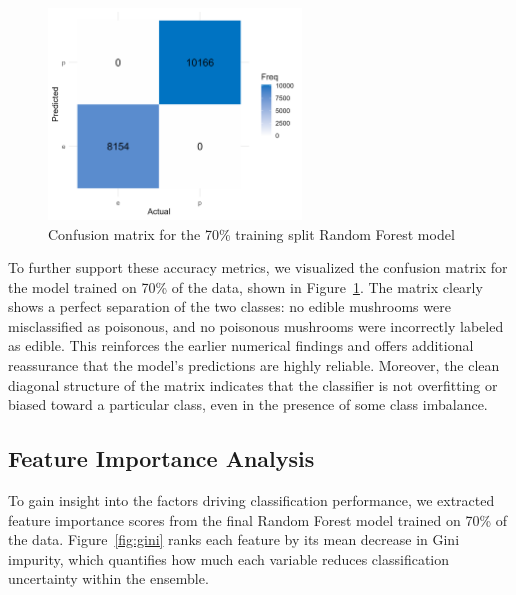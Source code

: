 \documentclass[a4paper,11pt]{article}
\begin{document}
\begin{figure}[h]
\centering
\includegraphics[width=0.6\textwidth]{Figure5-confusion-matrix.png}
\caption{Confusion matrix for the 70\% training split Random Forest model}
\label{fig:conf_matrix}
\end{figure}

To further support these accuracy metrics, we visualized the confusion matrix for the model trained on 70\% of the data, shown in Figure~\ref{fig:conf_matrix}. The matrix clearly shows a perfect separation of the two classes: no edible mushrooms were misclassified as poisonous, and no poisonous mushrooms were incorrectly labeled as edible. This reinforces the earlier numerical findings and offers additional reassurance that the model’s predictions are highly reliable. Moreover, the clean diagonal structure of the matrix indicates that the classifier is not overfitting or biased toward a particular class, even in the presence of some class imbalance.

\subsection{Feature Importance Analysis}

To gain insight into the factors driving classification performance, we extracted feature importance scores from the final Random Forest model trained on 70\% of the data. Figure~\ref{fig:gini} ranks each feature by its mean decrease in Gini impurity, which quantifies how much each variable reduces classification uncertainty within the ensemble.
\end{document}
